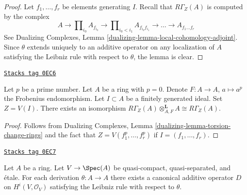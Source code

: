 \begin{proof}
Let $f_1, \ldots, f_r$ be elements generating $I$.
Recall that $R\Gamma_Z(A)$ is computed by the complex
$$
A \to \prod\nolimits_{i_0} A_{f_{i_0}} \to
\prod\nolimits_{i_0 < i_1} A_{f_{i_0}f_{i_1}}
\to \ldots \to A_{f_1\ldots f_r}
$$
See Dualizing Complexes, Lemma \ref{dualizing-lemma-local-cohomology-adjoint}.
Since $\theta$ extends uniquely to an additive operator on
any localization of $A$ satisfying the Leibniz rule with
respect to $\theta$, the lemma is clear.
\end{proof}

\begin{lemma}[Frobenius]
\label{local-cohomology-lemma-frobenius}
\href{https://stacks.math.columbia.edu/tag/0EC6}{\texttt{Stacks tag 0EC6}}

Let $p$ be a prime number. Let $A$ be a ring with $p = 0$.
Denote $F : A \to A$, $a \mapsto a^p$ the Frobenius endomorphism.
Let $I \subset A$ be a finitely generated ideal. Set $Z = V(I)$.
There exists an isomorphism
$R\Gamma_Z(A) \otimes_{A, F}^\mathbf{L} A \cong R\Gamma_Z(A)$.
\end{lemma}

\begin{proof}
Follows from Dualizing Complexes, Lemma
\ref{dualizing-lemma-torsion-change-rings}
and the fact that $Z = V(f_1^p, \ldots, f_r^p)$
if $I = (f_1, \ldots, f_r)$.
\end{proof}

\begin{lemma}
\label{local-cohomology-lemma-etale-derivation}
\href{https://stacks.math.columbia.edu/tag/0EC7}{\texttt{Stacks tag 0EC7}}

Let $A$ be a ring. Let $V \to \Spec(A)$ be quasi-compact, quasi-separated,
and \'etale. For each derivation $\theta : A \to A$ there exists a canonical
additive operator $D$ on $H^i(V, \mathcal{O}_V)$
satisfying the Leibniz rule with respect to $\theta$.
\end{lemma}

